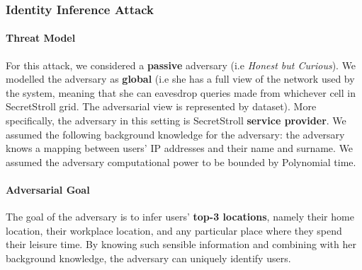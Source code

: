\documentclass[10pt,conference,compsocconf]{IEEEtran}
\begin{document}
\subsubsection{Identity Inference Attack}


\paragraph{Threat Model}
For this attack, we considered a \textbf{passive} adversary (i.e \textit{Honest but Curious}). We modelled the adversary as \textbf{global} (i.e she has a full view of the network used by the system, meaning that she can eavesdrop queries made from whichever cell in SecretStroll grid. The adversarial view is represented by  dataset). More specifically, the adversary in this setting is SecretStroll \textbf{service provider}.\newline
We assumed the following background knowledge for the adversary: the adversary knows a mapping between users' IP addresses and their name and surname.\newline
We assumed the adversary computational power to be bounded by Polynomial time.


\paragraph{Adversarial Goal}
The goal of the adversary is to infer users' \textbf{top-3 locations}, namely their home location, their workplace location, and any particular place where they spend their leisure time. By knowing such sensible information and combining with her background knowledge, the adversary can uniquely identify users.
\end{document}
